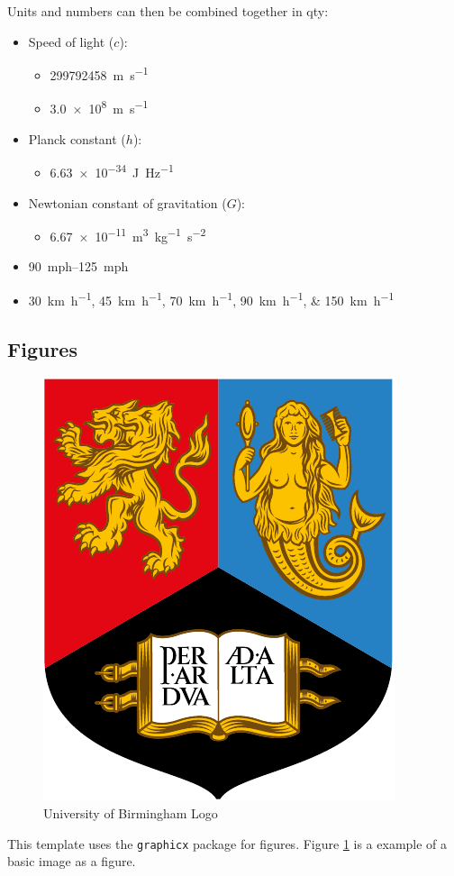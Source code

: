 Units and numbers can then be combined together in qty:
\begin{itemize}
    \item Speed of light ($c$): 
        \begin{itemize}
            \item \qty{299792458}{m.s^{-1}}
            \item \qty{3.0e8}{\metre\per\second}
        \end{itemize}
    \item Planck constant ($h$): 
        \begin{itemize}
            \item \qty{6.63e-34}{J.Hz^{-1}}
        \end{itemize}
    \item Newtonian constant of gravitation ($G$): 
        \begin{itemize}
            \item \qty{6.67e-11}{m^3.kg^{-1}.s^{-2}}
        \end{itemize}
    \item \qtyrange{90}{125}{mph}
    \item \qtylist{30;45;70;90;150}{\km \per \hour}
\end{itemize}

\subsection{Figures}

\begin{figure}[H]
    \centering
    \includegraphics[width=0.3\linewidth]{images/uob_logo.pdf}
    \caption{University of Birmingham Logo}
    \label{fig:uob_logo}
\end{figure}

This template uses the \verb|graphicx| package for figures. Figure \ref{fig:uob_logo} is a example of a  basic image as a figure.



